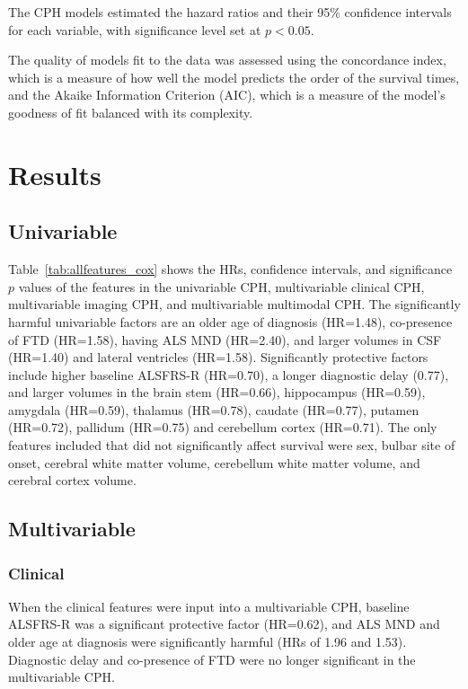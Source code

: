 The CPH models estimated the hazard ratios and their 95\% confidence intervals for each variable, with significance level set at $p<0.05$.

The quality of models fit to the data was assessed using the concordance index, which is a measure of how well the model predicts the order of the survival times, and the Akaike Information Criterion (AIC), which is a measure of the model's goodness of fit balanced with its complexity.

\section{Results}

\subsection{Univariable}



Table~\ref{tab:allfeatures_cox} shows the HRs, confidence intervals, and significance $p$ values of the features in the univariable CPH, multivariable clinical CPH, multivariable imaging CPH, and multivariable multimodal CPH.
The significantly harmful univariable factors are an older age of diagnosis (HR=1.48), co-presence of FTD (HR=1.58), having ALS MND (HR=2.40), and larger volumes in CSF (HR=1.40) and lateral ventricles (HR=1.58).
Significantly protective factors include higher baseline ALSFRS-R (HR=0.70), a longer diagnostic delay (0.77), and larger volumes in the brain stem (HR=0.66), hippocampus (HR=0.59), amygdala (HR=0.59), thalamus (HR=0.78), caudate (HR=0.77), putamen (HR=0.72), pallidum (HR=0.75) and cerebellum cortex (HR=0.71).
The only features included that did not significantly affect survival were sex, bulbar site of onset, cerebral white matter volume, cerebellum white matter volume, and cerebral cortex volume.


\subsection{Multivariable}

\subsubsection{Clinical}
When the clinical features were input into a multivariable CPH, baseline ALSFRS-R was a significant protective factor (HR=0.62), and ALS MND and older age at diagnosis were significantly harmful (HRs of 1.96 and 1.53). 
Diagnostic delay and co-presence of FTD were no longer significant in the multivariable CPH.

